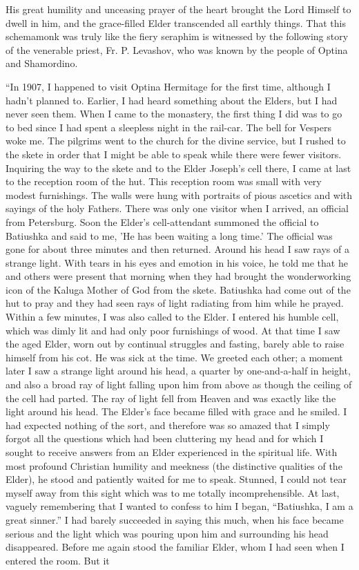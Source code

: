 His great humility and unceasing prayer of the heart brought the Lord Himself to dwell in him, and the grace-filled Elder transcended all earthly things. That this schemamonk was truly like the fiery seraphim is witnessed by the following story of the venerable priest, Fr. P. Levashov, who was known by the people of Optina and Shamordino.

“In 1907, I happened to visit Optina Hermitage for the first time, although I hadn't planned to. Earlier, I had heard something about the Elders, but I had never seen them. When I came to the monastery, the first thing I did was to go to bed since I had spent a sleepless night in the rail-car. The bell for Vespers woke me. The pilgrims went to the church for the divine service, but I rushed to the skete in order that I might be able to speak while there were fewer visitors. Inquiring the way to the skete and to the Elder Joseph's cell there, I came at last to the reception room of the hut. This reception room was small with very modest furnishings. The walls were hung with portraits of pious ascetics and with sayings of the holy Fathers. There was only one visitor when I arrived, an official from Petersburg. Soon the Elder's cell-attendant summoned the official to Batiushka and said to me, 'He has been waiting a long time.' The official was gone for about three minutes and then returned. Around his head I saw rays of a strange light. With tears in his eyes and emotion in his voice, he told me that he and others were present that morning when they had brought the wonderworking icon of the Kaluga Mother of God from the skete. Batiushka had come out of the hut to pray and they had seen rays of light radiating from him while he prayed. Within a few minutes, I was also called to the Elder. I entered his humble cell, which was dimly lit and had only poor furnishings of wood. At that time I saw the aged Elder, worn out by continual struggles and fasting, barely able to raise himself from his cot. He was sick at the time. We greeted each other; a moment later I saw a strange light around his head, a quarter by one-and-a-half in height, and also a broad ray of light falling upon him from above as though the ceiling of the cell had parted. The ray of light fell from Heaven and was exactly like the light around his head. The Elder's face became filled with grace and he smiled. I had expected nothing of the sort, and therefore was so amazed that I simply forgot all the questions which had been cluttering my head and for which I sought to receive answers from an Elder experienced in the spiritual life. With most profound Christian humility and meekness (the distinctive qualities of the Elder), he stood and patiently waited for me to speak. Stunned, I could not tear myself away from this sight which was to me totally incomprehensible. At last, vaguely remembering that I wanted to confess to him I began, “Batiushka, I am a great sinner.” I had barely succeeded in saying this much, when his face became serious and the light which was pouring upon him and surrounding his head disappeared. Before me again stood the familiar Elder, whom I had seen when I entered the room. But it 